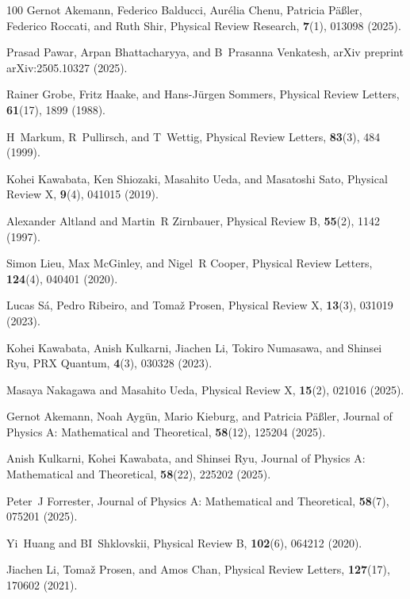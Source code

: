 \documentclass[preprint,pteplogo]{ptephy_v2}%
\numberwithin{equation}{section}
\theoremstyle{definition}
\begin{document}
\begin{thebibliography}{100}
Gernot Akemann, Federico Balducci, Aur{\'e}lia Chenu, Patricia P{\"a}{\ss}ler, Federico Roccati, and Ruth Shir, Physical Review Research, {\bf 7}(1), 013098 (2025).

Prasad Pawar, Arpan Bhattacharyya, and B~Prasanna Venkatesh, arXiv preprint arXiv:2505.10327 (2025).

Rainer Grobe, Fritz Haake, and Hans-J{\"u}rgen Sommers, Physical Review Letters, {\bf 61}(17), 1899 (1988).

H~Markum, R~Pullirsch, and T~Wettig, Physical Review Letters, {\bf 83}(3), 484 (1999).

Kohei Kawabata, Ken Shiozaki, Masahito Ueda, and Masatoshi Sato, Physical Review X, {\bf 9}(4), 041015 (2019).

Alexander Altland and Martin~R Zirnbauer, Physical Review B, {\bf 55}(2), 1142 (1997).

Simon Lieu, Max McGinley, and Nigel~R Cooper, Physical Review Letters, {\bf 124}(4), 040401 (2020).

Lucas S{\'a}, Pedro Ribeiro, and Toma{\v{z}} Prosen, Physical Review X, {\bf 13}(3), 031019 (2023).

Kohei Kawabata, Anish Kulkarni, Jiachen Li, Tokiro Numasawa, and Shinsei Ryu, PRX Quantum, {\bf 4}(3), 030328 (2023).

Masaya Nakagawa and Masahito Ueda, Physical Review X, {\bf 15}(2), 021016 (2025).

Gernot Akemann, Noah Ayg{\"u}n, Mario Kieburg, and Patricia P{\"a}{\ss}ler, Journal of Physics A: Mathematical and Theoretical, {\bf 58}(12), 125204 (2025).

Anish Kulkarni, Kohei Kawabata, and Shinsei Ryu, Journal of Physics A: Mathematical and Theoretical, {\bf 58}(22), 225202 (2025).

Peter~J Forrester, Journal of Physics A: Mathematical and Theoretical, {\bf 58}(7), 075201 (2025).

Yi~Huang and BI~Shklovskii, Physical Review B, {\bf 102}(6), 064212 (2020).

Jiachen Li, Toma{\v{z}} Prosen, and Amos Chan, Physical Review Letters, {\bf 127}(17), 170602 (2021).


\end{thebibliography}
\end{document}

